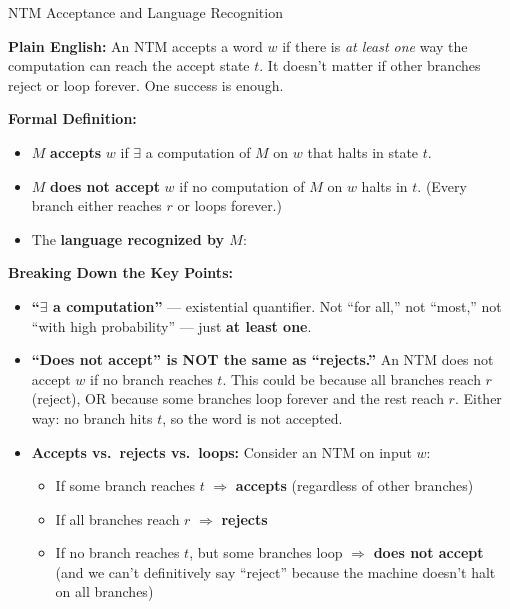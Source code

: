 \begin{definitionbox}{NTM Acceptance and Language Recognition}

\textbf{Plain English:}
An NTM accepts a word $w$ if there is \emph{at least one} way the computation
can reach the accept state $t$. It doesn't matter if other branches reject or
loop forever. One success is enough.

\textbf{Formal Definition:}
\begin{itemize}[nosep]
\item $M$ \textbf{accepts} $w$ if $\exists$ a computation of $M$ on $w$ that
  halts in state $t$.
\item $M$ \textbf{does not accept} $w$ if no computation of $M$ on $w$ halts
  in $t$.
  (Every branch either reaches $r$ or loops forever.)
\item The \textbf{language recognized by $M$}:
\end{itemize}

\textbf{Breaking Down the Key Points:}
\begin{itemize}[nosep]
\item \textbf{``$\exists$ a computation''} --- existential quantifier. Not ``for
  all,'' not ``most,'' not ``with high probability'' --- just \textbf{at least
  one}.
\item \textbf{``Does not accept'' is NOT the same as ``rejects.''} An NTM does
  not accept $w$ if no branch reaches $t$. This could be because all branches
  reach $r$ (reject), OR because some branches loop forever and the rest reach
  $r$. Either way: no branch hits $t$, so the word is not accepted.
\item \textbf{Accepts vs.\ rejects vs.\ loops:} Consider an NTM on input $w$:
  \begin{itemize}[nosep]
  \item If some branch reaches $t$ $\Rightarrow$ \textbf{accepts} (regardless
    of other branches)
  \item If all branches reach $r$ $\Rightarrow$ \textbf{rejects}
  \item If no branch reaches $t$, but some branches loop $\Rightarrow$
    \textbf{does not accept} (and we can't definitively say ``reject'' because
    the machine doesn't halt on all branches)
  \end{itemize}
\end{itemize}

\end{definitionbox}

